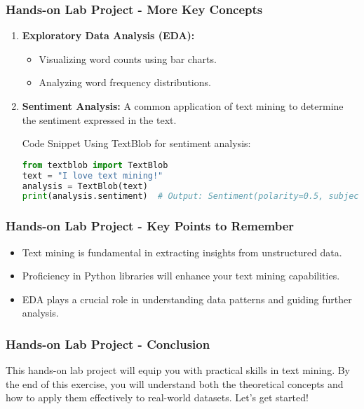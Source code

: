 \documentclass[aspectratio=169]{beamer}
\begin{document}
\begin{frame}[fragile]
    \frametitle{Hands-on Lab Project - More Key Concepts}
    \begin{enumerate}[resume]
        \item \textbf{Exploratory Data Analysis (EDA):} 
        \begin{itemize}
            \item Visualizing word counts using bar charts.
            \item Analyzing word frequency distributions.
        \end{itemize}

        \item \textbf{Sentiment Analysis:} 
        A common application of text mining to determine the sentiment expressed in the text.

        \begin{block}{Code Snippet}
            Using TextBlob for sentiment analysis:
            \begin{lstlisting}[language=python]
from textblob import TextBlob
text = "I love text mining!"
analysis = TextBlob(text)
print(analysis.sentiment)  # Output: Sentiment(polarity=0.5, subjectivity=0.6)
            \end{lstlisting}
        \end{block}
    \end{enumerate}
\end{frame}

\begin{frame}
    \frametitle{Hands-on Lab Project - Key Points to Remember}
    \begin{itemize}
        \item Text mining is fundamental in extracting insights from unstructured data.
        \item Proficiency in Python libraries will enhance your text mining capabilities.
        \item EDA plays a crucial role in understanding data patterns and guiding further analysis.
    \end{itemize}
\end{frame}

\begin{frame}
    \frametitle{Hands-on Lab Project - Conclusion}
    This hands-on lab project will equip you with practical skills in text mining. 
    By the end of this exercise, you will understand both the theoretical concepts and how to apply them effectively to real-world datasets.
    Let’s get started!
\end{frame}
\end{document}

